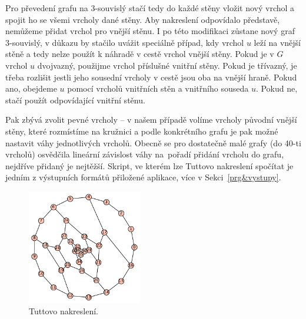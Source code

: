 Pro převedení grafu na 3-souvislý stačí tedy do každé stěny vložit nový vrchol a spojit ho se všemi vrcholy dané stěny. Aby nakreslení odpovídalo představě, nemůžeme přidat vrchol pro vnější stěnu. I po této modifikaci zůstane nový graf 3-souvislý, v důkazu by stačilo uvážit speciálně případ, kdy vrchol $u$ leží na vnější stěně a tedy nelze použít k náhradě v cestě vrchol vnější stěny. Pokud je v $G$ vrchol $u$ dvojvazný, použijme vrchol příslušné vnitřní stěny. Pokud je třívazný, je třeba rozlišit jestli jeho sousední vrcholy v cestě jsou oba na vnější hraně. Pokud ano, obejdeme $u$ pomocí vrcholů vnitřních stěn a vnitřního souseda $u$. Pokud ne, stačí použít odpovídající vnitřní stěnu. 

Pak zbývá zvolit pevné vrcholy -- v našem případě volíme vrcholy původní vnější stěny, které rozmístíme na kružnici a podle konkrétního grafu je pak možné nastavit váhy jednotlivých vrcholů. Obecně se pro dostatečně malé grafy (do 40-ti vrcholů) osvědčila lineární závislost váhy na~pořadí přidání vrcholu do grafu, nejdříve přidaný je nejtěžší. Skript, ve kterém lze Tuttovo nakreslení spočítat je jedním z výstupních formátů přiložené aplikace, více v Sekci~\ref{prg&vystupy}.


\begin{figure}[h]\centering
\includegraphics[width = 50mm]{../img/tutteplot}
\caption{Tuttovo nakreslení.}
\label{obr:tutteplot}
\end{figure}